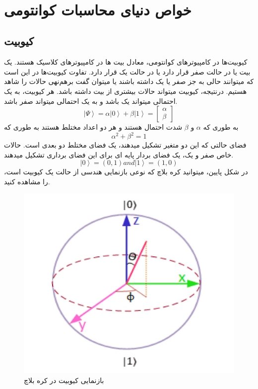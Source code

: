 ‌\chapter{‌خواص دنیای محاسبات کوانتومی}
\section{کیوبیت}
کیوبیت‌ها
 در کامپیوترهای کوانتومی، معادل بیت ها
 در کامپیوترهای کلاسیک هستند. یک بیت یا در حالت صفر قرار دارد یا در حالت یک قرار دارد. تفاوت کیوبیت‌ها در این است که میتوانند حالی به جز صفر یا یک داشته باشند یا میتوان گفت برهم‌نهی 
حالات را شاهد هستیم. درنتیجه، کیوبیت میتواند حالات بیشتری از بیت داشته باشد. هر کیوبیت، به یک احتمالی میتواند یک باشد و به یک احتمالی میتواند صفر باشد. 
\begin{equation}
\left|\Psi\right\rangle = \alpha\left|0\right\rangle + \beta\left|1\right\rangle = \begin{bmatrix}
 \alpha
\\
\beta
\end{bmatrix}
\end{equation}
به طوری که 
$\alpha$
 و 
$\beta$
  شدت احتمال هستند و هر دو اعداد مختلط هستند به طوری که
\begin{equation}
\alpha^{2} + \beta^{2} = 1
\end{equation}
فضای حالتی که این دو متغیر تشکیل میدهند، یک فضای مختلط دو بعدی است.  حالات خاص صفر و یک، یک فضای بردار پایه ای
برای این فضای برداری تشکیل میدهند.
\begin{equation}
\left|0\right\rangle = (0, 1) and \left|1\right\rangle = (1, 0)
\end{equation}
در شکل پایین، میتوانید کره بلاچ
  که نوعی بازنمایی هندسی از حالت یک کیوبیت است، را مشاهده کنید.
\begin{figure}[!h]
\centerline{\includegraphics[width=.5\textwidth]{bloch.jpeg}}
\caption{بازنمایی کیوبیت در کره بلاچ}
\end{figure}
